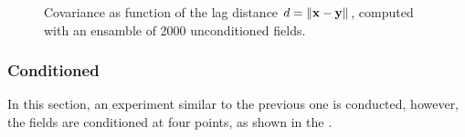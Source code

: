 \begin{figure}[H]
 \caption{Covariance as function of the lag distance $d=\lVert \mathbf{x} - \mathbf{y} \rVert$, computed with an ensamble of 2000 unconditioned fields.}
 \label{fig-uncondCov}
\end{figure}

\subsubsection{Conditioned}

In this section, an experiment similar to the previous one is conducted, however, the fields are conditioned at four points, as shown in the .


